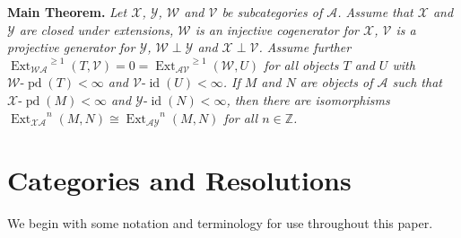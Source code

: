 \documentclass{amsart}
\begin{document}
\noindent
\textbf{Main Theorem.}
\textit{Let ${{\mathcal{{X}}}}$, ${{\mathcal{{Y}}}}$, ${{\mathcal{{W}}}}$ and ${{\mathcal{{V}}}}$ be subcategories of ${{\mathcal{{A}}}}$.
Assume that ${{\mathcal{{X}}}}$ and ${{\mathcal{{Y}}}}$ are  closed under extensions,
${{\mathcal{{W}}}}$ is an injective cogenerator for ${{\mathcal{{X}}}}$, 
${{\mathcal{{V}}}}$ is a projective generator for ${{\mathcal{{Y}}}}$,
${{\mathcal{{W}}}}\perp{{\mathcal{{Y}}}}$ and ${{\mathcal{{X}}}}\perp{{\mathcal{{V}}}}$.
Assume further
${{\operatorname{Ext}}_{{{\mathcal{{W}}}} {{\mathcal{{A}}}}}}^{{\geqslant}1}(T,{{\mathcal{{V}}}})=0={{\operatorname{Ext}}_{{{\mathcal{{A}}}}{{\mathcal{{V}}}}}}^{{\geqslant}1}({{\mathcal{{W}}}}, U)$
for all objects $T$ and $U$ with
${{{\mathcal{{{W}}}}\text{-}{\operatorname{pd}}}}(T)<\infty$ and ${{{\mathcal{{{V}}}}\text{-}{\operatorname{id}}}}(U)<\infty$.
If $M$ and $N$ are objects of ${{\mathcal{{A}}}}$ such that
${{{\mathcal{{{X}}}}\text{-}{\operatorname{pd}}}}(M)<\infty$ and ${{{\mathcal{{{Y}}}}\text{-}{\operatorname{id}}}}(N)<\infty$, then
there are isomorphisms
${{\operatorname{Ext}}_{{{\mathcal{{X}}}}\!{{\mathcal{{A}}}}}}^n(M,N)\cong{{\operatorname{Ext}}_{{{\mathcal{{A}}}}{{\mathcal{{Y}}}}}}^n(M,N)$
for all $n\in{\mathbb{Z}}$.
}

\section{Categories and Resolutions}\label{sec1}

We begin with some notation and terminology for use throughout this paper.
\end{document}
